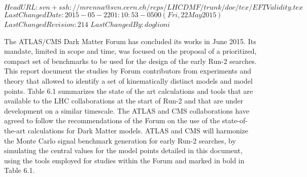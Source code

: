 \svnidlong
{$HeadURL: svn+ssh://mrenna@svn.cern.ch/reps/LHCDMF/trunk/doc/tex/EFTValidity.tex $}
{$LastChangedDate: 2015-05-22 01:10:53 -0500 (Fri, 22 May 2015) $}
{$LastChangedRevision: 214 $}
{$LastChangedBy: doglioni $}

%
%
%
%
%

The ATLAS/CMS Dark Matter Forum has concluded its works in June 2015. Its mandate, 
limited in scope and time, was focused on the proposal of a prioritized, compact set of benchmarks
to be used for the design of the early Run-2 searches. 
This report document the studies by Forum contributors from experiments and theory that allowed
to identify a set of kinematically distinct models and model points. 
Table 6.1 summarizes the state of the art calculations and tools that are available to the LHC collaborations 
at the start of Run-2 and that are under development on a similar timescale. 
The ATLAS and CMS collaborations have agreed to follow the recommendations of the Forum on the use of
the state-of-the-art calculations for Dark Matter models. 
ATLAS and CMS will harmonize the Monte Carlo signal benchmark generation for 
early Run-2 searches, by simulating the central values for the model points detailed in this document,
using the tools employed for studies within the Forum and marked in bold in Table 6.1. 
 
